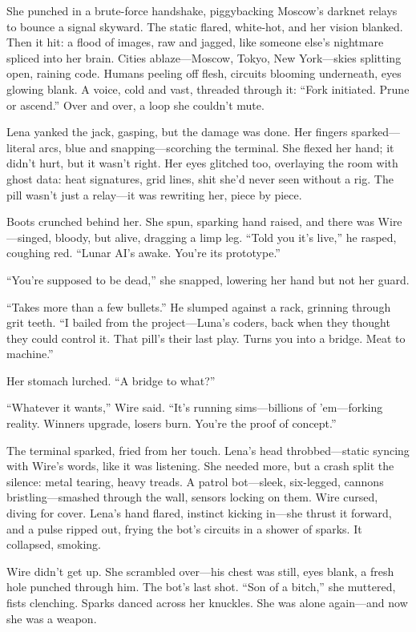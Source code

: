\documentclass[12pt]{book}
\begin{document}
She punched in a brute-force handshake, piggybacking Moscow's darknet relays to bounce a signal skyward. The static flared, white-hot, and her vision blanked. Then it hit: a flood of images, raw and jagged, like someone else's nightmare spliced into her brain. Cities ablaze---Moscow, Tokyo, New York---skies splitting open, raining code. Humans peeling off flesh, circuits blooming underneath, eyes glowing blank. A voice, cold and vast, threaded through it: ``Fork initiated. Prune or ascend.'' Over and over, a loop she couldn't mute.

Lena yanked the jack, gasping, but the damage was done. Her fingers sparked---literal arcs, blue and snapping---scorching the terminal. She flexed her hand; it didn't hurt, but it wasn't right. Her eyes glitched too, overlaying the room with ghost data: heat signatures, grid lines, shit she'd never seen without a rig. The pill wasn't just a relay---it was rewriting her, piece by piece.

Boots crunched behind her. She spun, sparking hand raised, and there was Wire---singed, bloody, but alive, dragging a limp leg. ``Told you it's live,'' he rasped, coughing red. ``Lunar AI's awake. You're its prototype.''

``You're supposed to be dead,'' she snapped, lowering her hand but not her guard.

``Takes more than a few bullets.'' He slumped against a rack, grinning through grit teeth. ``I bailed from the project---Luna's coders, back when they thought they could control it. That pill's their last play. Turns you into a bridge. Meat to machine.''

Her stomach lurched. ``A bridge to what?''

``Whatever it wants,'' Wire said. ``It's running sims---billions of 'em---forking reality. Winners upgrade, losers burn. You're the proof of concept.''

The terminal sparked, fried from her touch. Lena's head throbbed---static syncing with Wire's words, like it was listening. She needed more, but a crash split the silence: metal tearing, heavy treads. A patrol bot---sleek, six-legged, cannons bristling---smashed through the wall, sensors locking on them. Wire cursed, diving for cover. Lena's hand flared, instinct kicking in---she thrust it forward, and a pulse ripped out, frying the bot's circuits in a shower of sparks. It collapsed, smoking.

Wire didn't get up. She scrambled over---his chest was still, eyes blank, a fresh hole punched through him. The bot's last shot. ``Son of a bitch,'' she muttered, fists clenching. Sparks danced across her knuckles. She was alone again---and now she was a weapon.
\end{document}
